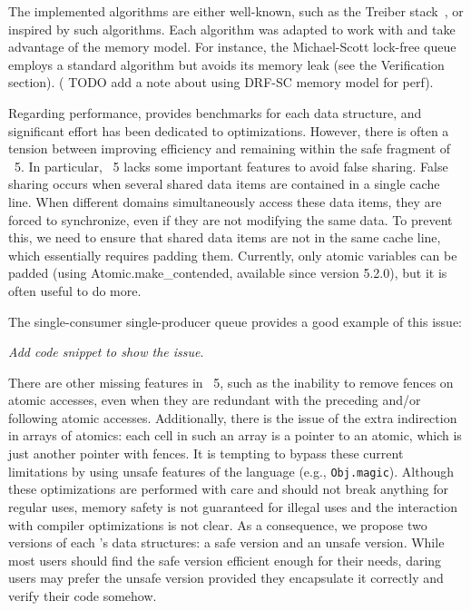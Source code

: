 \documentclass[a4paper, 11pt]{article}
\begin{document}
The implemented algorithms are either well-known, such as the Treiber stack~\cite{treiber1986systems}, or inspired by such algorithms. Each algorithm was adapted to work with and take advantage of the \OCaml memory model. For instance, the Michael-Scott lock-free queue~\cite{michael1996simple} employs a standard algorithm but avoids its memory leak (see the Verification section). ( TODO add a note about using DRF-SC memory model for perf).

Regarding performance, \Saturn provides benchmarks for each data structure, and significant effort has been dedicated to optimizations. However, there is often a tension between improving efficiency and remaining within the safe fragment of \OCaml~5. In particular, \OCaml~5 lacks some important features to avoid false sharing. False sharing occurs when several shared data items are contained in a single cache line. When different domains simultaneously access these data items, they are forced to synchronize, even if they are not modifying the same data. To prevent this, we need to ensure that shared data items are not in the same cache line, which essentially requires padding them. Currently, only atomic variables can be padded (using Atomic.make\_contended, available since version 5.2.0), but it is often useful to do more. 

The single-consumer single-producer queue provides a good example of this issue: 

\emph{Add code snippet to show the issue}.

There are other missing features in \OCaml~5, such as the inability to remove fences on atomic accesses, even when they are redundant with the preceding and/or following atomic accesses. Additionally, there is the issue of the extra indirection in arrays of atomics: each cell in such an array is a pointer to an atomic, which is just another pointer with fences. It is tempting to bypass these current limitations by using unsafe features of the language (e.g., \texttt{Obj.magic}). Although these optimizations are performed with care and should not break anything for regular uses, memory safety is not guaranteed for illegal uses and the interaction with compiler optimizations is not clear. As a consequence, we propose two versions of each \Saturn's data structures: a safe version and an unsafe version. While most users should find the safe version efficient enough for their needs, daring users may prefer the unsafe version provided they encapsulate it correctly and verify their code somehow.
\end{document}
